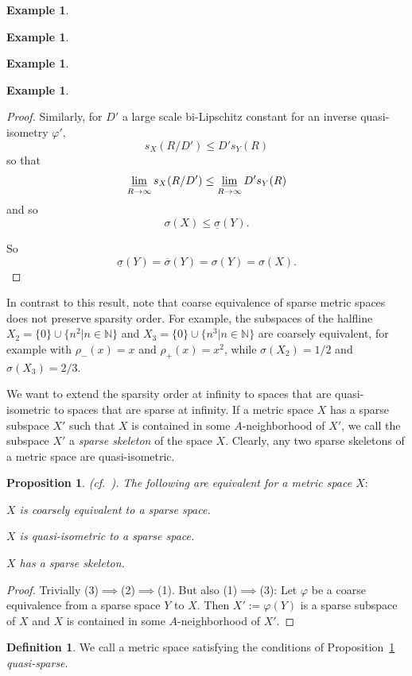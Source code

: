 \documentclass[12pt]{amsart}
\newtheorem{proposition}[theorem]{Proposition}
\theoremstyle{definition}
\newtheorem{definition}[theorem]{Definition}
\newtheorem{example}[theorem]{Example}
\theoremstyle{remark}
\numberwithin{equation}{section}
\newcommand{\ph}{\varphi}
\newcommand{\ls}{\underline{\sigma}}
\newcommand{\us}{\overline{\sigma}}
\begin{document}
\begin{example}
\begin{example}
\begin{example}
\begin{example}
\begin{proof}
Similarly, for $D'$ a large scale bi-Lipschitz constant for an inverse
quasi-isometry $\ph',$
\begin{equation*}
s_X (R/D') \leq D' s_Y (R)
\end{equation*}
so that
\begin{equation*}
\varliminf_{R\to \infty} s_X (R/D') \leq \varliminf_{R\to \infty} D'
s_Y (R)
\end{equation*}
and so
\begin{equation*}
\sigma(X) \leq \ls(Y).
\end{equation*}

So
\begin{equation*}
\ls(Y)=\us(Y)=\sigma(Y)=\sigma(X).
\end{equation*}
\end{proof}

In contrast to this result, note that coarse equivalence of sparse
metric spaces does not preserve sparsity order. For example, the
subspaces of the halfline $X_2=\{0\} \cup \{n^2 | n\in \mathbb{N}\}$
and $X_3=\{0\}\cup \{n^3 | n\in \mathbb{N}\}$ are coarsely equivalent,
for example with $\rho_-(x)=x$ and $\rho_+(x)=x^2$, while
$\sigma(X_2)=1/2$ and $\sigma(X_3)=2/3$.

We want to extend the sparsity order at infinity to spaces that are
quasi-isometric to spaces that are sparse at infinity. If a metric
space $X$ has a sparse subspace $X'$ such that $X$ is contained in
some $A$-neighborhood of $X'$, we call the subspace $X'$ a {\em sparse
  skeleton} of the space $X$. Clearly, any two sparse skeletons of a
metric space are quasi-isometric.

\begin{proposition}\label{qs}
{\rm (cf.~\cite{P}).}
The following are equivalent for a metric space $X:$
\item[(1)] $X$ is coarsely equivalent to a sparse space.
\item[(2)] $X$ is quasi-isometric to a sparse space.
\item[(3)] $X$ has a sparse skeleton.
\end{proposition}

\begin{proof}
Trivially (3)$\implies$(2)$\implies$(1). But also (1)$\implies$(3):
Let $\ph$ be a coarse equivalence from a sparse space $Y$ to $X.$ Then
$X':=\ph(Y)$ is a sparse subspace of $X$ and $X$ is contained in some
$A$-neighborhood of $X'.$
\end{proof}

\begin{definition}
We call a metric space satisfying the conditions of
Proposition~\ref{qs} {\em quasi-sparse}.
\end{definition}


\end{example}
\end{example}
\end{example}
\end{example}
\end{document}
